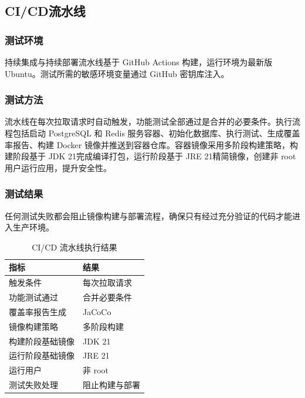 \subsection{CI/CD流水线}

\subsubsection{测试环境}

\par 持续集成与持续部署流水线基于 GitHub Actions 构建，运行环境为最新版 Ubuntu。测试所需的敏感环境变量通过 GitHub 密钥库注入。

\subsubsection{测试方法}

\par 流水线在每次拉取请求时自动触发，功能测试全部通过是合并的必要条件。执行流程包括启动 PostgreSQL 和 Redis 服务容器、初始化数据库、执行测试、生成覆盖率报告、构建 Docker 镜像并推送到容器仓库。容器镜像采用多阶段构建策略，构建阶段基于 JDK 21完成编译打包，运行阶段基于 JRE 21精简镜像，创建非 root 用户运行应用，提升安全性。

\subsubsection{测试结果}

\par 任何测试失败都会阻止镜像构建与部署流程，确保只有经过充分验证的代码才能进入生产环境。

\begin{table}[htbp]
  \centering
  \caption{CI/CD 流水线执行结果}
  \label{tab:cicd-result}
  \begin{tabular}{p{4cm}p{4cm}}
    \hline
    指标 & 结果 \\
    \hline
    触发条件 & 每次拉取请求 \\
    功能测试通过 & 合并必要条件 \\
    覆盖率报告生成 & JaCoCo \\
    镜像构建策略 & 多阶段构建 \\
    构建阶段基础镜像 & JDK 21 \\
    运行阶段基础镜像 & JRE 21 \\
    运行用户 & 非 root \\
    测试失败处理 & 阻止构建与部署 \\
    \hline
  \end{tabular}
\end{table}
